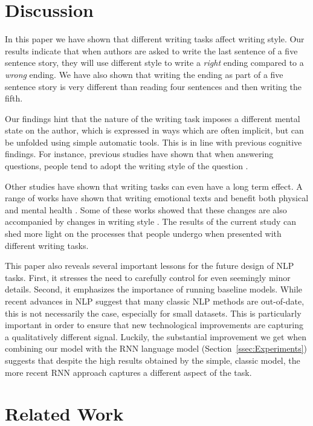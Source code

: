 \documentclass[11pt,a4paper]{article}
\newcommand{\secref}[1]{Section~\ref{ssec:#1}}
\newcommand{\isection}[2]{\section{#1}\label{ssec:#2}}
\newcommand{\isectionb}[1]{\section{#1}\label{ssec:#1}}
\begin{document}
\isectionb{Discussion}

In this paper we have shown that different writing tasks affect writing style. 
Our results indicate that when authors are asked to write the last sentence of a five sentence story, they will use different style to write a {\it right} ending compared to a {\it wrong} ending. We have also shown that writing the ending as part of a five sentence story is very different than reading four sentences and then writing the fifth.

Our findings hint that the nature of the writing task imposes a different mental state on the author, which is expressed in ways which are often implicit, but can be unfolded using simple automatic tools. 
This is in line with previous cognitive findings. 
For instance, previous studies have shown that when answering questions, people  tend to adopt the writing style of the question \cite{Ireland:2010}.


Other studies have shown that writing tasks can even have a long term effect.
A range of works have shown that writing emotional texts and benefit both physical and mental health \cite{Lepore:2002,Frattaroli:2006}. 
Some of these works showed that these changes are also accompanied by changes in writing style \cite{Campbell:2003}. 
The results of the current study can shed more light on the processes that people undergo when presented with different writing tasks.


This paper also reveals several important lessons for the future design of NLP tasks. 
First, it stresses the need to carefully control for even seemingly minor details. 
Second, it emphasizes the importance of running baseline models.
While recent advances in NLP  suggest that many classic NLP methods are out-of-date, 
this is not necessarily the case, especially for small datasets.
This is particularly important in order to ensure that  new technological improvements are capturing a qualitatively different signal.
Luckily, the substantial improvement we get when combining our model with the RNN language model (\secref{Experiments}) suggests that despite the high results obtained by the simple, classic model, the more recent RNN approach captures a different aspect of the task.

\isection{Related Work}{Related}
\end{document}
